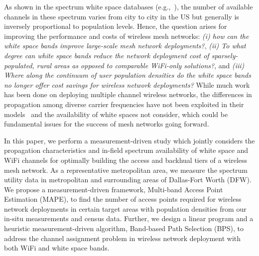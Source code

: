 As shown in the spectrum white space databases (e.g.,~\cite{googledatabase}), the number of available 
channels in these spectrum varies from city to city in the US but generally is inversely proportional to population levels. 
Hence, the question arises for 
improving the performance and costs of wireless mesh networks: {\it (i) how can the 
white space bands improve large-scale mesh network deployments?}, {\it (ii) To what degree can 
white space bands reduce the network deployment cost of sparsely-populated, rural areas as opposed 
to comparable WiFi-only solutions?}, and {\it (iii) Where along the continuum of user population 
densities do the white space bands no longer offer cost savings for wireless network deployments?} 
While much work has been done on deploying multiple channel wireless networks, the differences in 
propagation among diverse carrier frequencies have not been exploited in their models~\cite{tang2005interference, 
doraghinejad2014channel} and the availability of white spaces not consider, which could be fundamental issues for the success 
of mesh networks going forward. 


In this paper, we perform a measurement-driven study which jointly considers the propagation 
characteristics and in-field spectrum availability of white space and WiFi channels 
for optimally building the access and backhual tiers of a wireless mesh network.
As a representative metropolitan area, we measure the spectrum utility data in metropolitan 
and surrounding areas of Dallas-Fort Worth (DFW).  
We propose a measurement-driven framework, Multi-band Access Point Estimation (MAPE), to find the 
number of access points required for wireless network deployments in certain target areas with population 
densities from our in-situ measurements and census data. 
Further, we design a linear program and a heuristic measurement-driven algorithm, Band-based Path Selection (BPS), 
to address the channel assignment problem in wireless network deployment with both WiFi and white space bands. 


